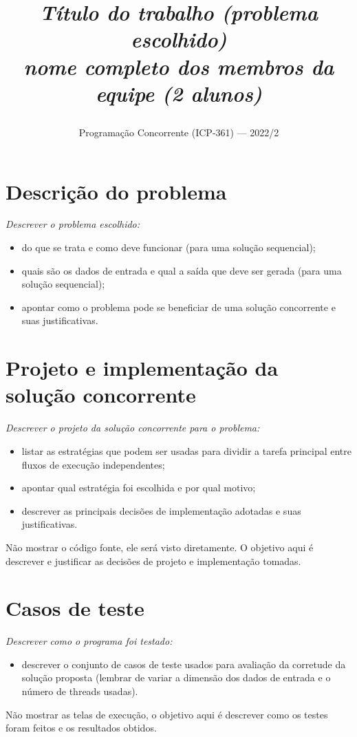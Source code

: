 \documentclass[14]{article}
\begin{document}
\title{{\em Título do trabalho (problema escolhido)} \\ 
{\em \normalsize nome completo dos membros da equipe (2 alunos)}
\author{Programação Concorrente (ICP-361) --- 2022/2}
\address{} 
\date{}}

\maketitle

\section{Descrição do problema}
{\em Descrever o problema escolhido: 
\begin{itemize}
	\item do que se trata e como deve funcionar {\color{red}(para uma solução sequencial)};
\item quais são os dados de entrada e qual a saída que deve ser gerada (para uma solução sequencial);
\item apontar como o problema pode se beneficiar de uma solução concorrente e suas justificativas.
\end{itemize}
}

\section{Projeto e implementação da solução concorrente}
{\em Descrever o projeto da solução concorrente para o problema: 
\begin{itemize}
\item listar as estratégias que podem ser usadas para dividir a tarefa principal entre fluxos
de execução independentes;
\item apontar qual estratégia foi escolhida e por qual motivo;		
\item descrever as principais decisões de implementação adotadas e suas justificativas.
\end{itemize}
}
{\color{red}Não mostrar o código fonte, ele será visto diretamente. 
O objetivo aqui é descrever e justificar as decisões de projeto e implementação tomadas.}

\section{Casos de teste}
{\em Descrever como o programa foi testado:
\begin{itemize}
\item descrever o conjunto de casos de teste usados para avaliação da corretude da solução proposta
(lembrar de variar a dimensão dos dados de entrada e o número de threads usadas).
\end{itemize}
}
{\color{red}Não mostrar as telas de execução, o objetivo aqui é descrever como os testes
foram feitos e os resultados obtidos.} 
\end{document}
